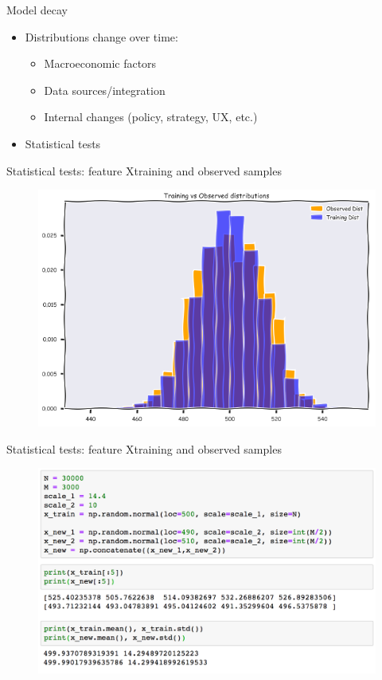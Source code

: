 \documentclass{beamer}
\begin{document}
\begin{frame}{Model decay}
	\begin{itemize}
		\item{Distributions change over time:}
		\begin{itemize}
			\item{Macroeconomic factors} %
			\item{Data sources/integration} %
			\item{Internal changes (policy, strategy, UX, etc.)} 
		\end{itemize}
		\item{Statistical tests} 
	\end{itemize}
\end{frame}


\begin{frame}{Statistical tests: feature X}{training and observed samples}
	\begin{figure}
		\centering
		\includegraphics[width=0.7\linewidth]{two_dist.png}
	\end{figure}
\end{frame}


\begin{frame}{Statistical tests: feature X}{training and observed samples}
	\begin{figure}
		\centering
		\includegraphics[width=0.8\linewidth]{two_dist_code.png}
	\end{figure}
\end{frame}
\end{document}
